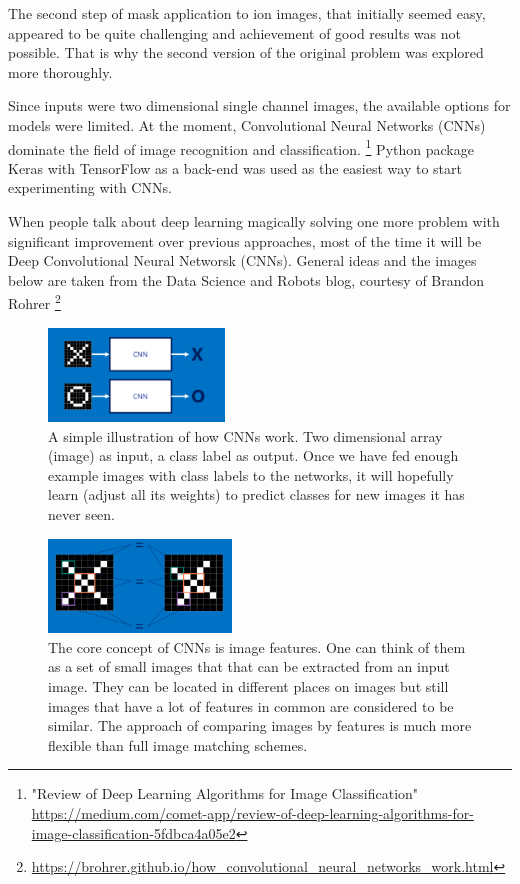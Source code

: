 \documentclass[a4paper]{article}
\begin{document}
    The second step of mask application to ion images, that initially seemed easy, appeared to be
    quite challenging and achievement of good results was not possible.
    That is why the second version of the original problem was explored more thoroughly.
    
    Since inputs were two dimensional single channel images, the available options for models were limited.
    At the moment, Convolutional Neural Networks (CNNs) dominate the field of image recognition and classification.
    \footnote{"Review of Deep Learning Algorithms for Image Classification"
        \url{https://medium.com/comet-app/review-of-deep-learning-algorithms-for-image-classification-5fdbca4a05e2}}
    Python package Keras with TensorFlow as a back-end was used as the easiest way to start experimenting with CNNs.
    
    When people talk about deep learning magically solving one more problem with significant improvement
    over previous approaches, most of the time it will be Deep Convolutional Neural Networsk (CNNs).
    General ideas and the images below are taken from the Data Science and Robots blog,
    courtesy of Brandon Rohrer
    \footnote{\url{https://brohrer.github.io/how_convolutional_neural_networks_work.html}}
    
    \begin{figure}[H]
        \centering
            \includegraphics[width=\textwidth,height=2.5cm,keepaspectratio]{cnn1.png}
        \caption{A simple illustration of how CNNs work. Two dimensional array (image) as input,
        a class label as output. Once we have fed enough example images with class labels to the
        networks, it will hopefully learn (adjust all its weights) to predict classes for new
        images it has never seen.}
    \end{figure}
    
    \begin{figure}[H]
        \centering
            \includegraphics[width=\textwidth,height=2.5cm,keepaspectratio]{cnn3.png}
        \caption{The core concept of CNNs is image features. One can think of them as a set of small images that
        that can be extracted from an input image. They can be located in different places on images but
        still images that have a lot of features in common are considered to be similar. The approach
        of comparing images by features is much more flexible than full image matching schemes.}
    \end{figure}
    
\end{document}
